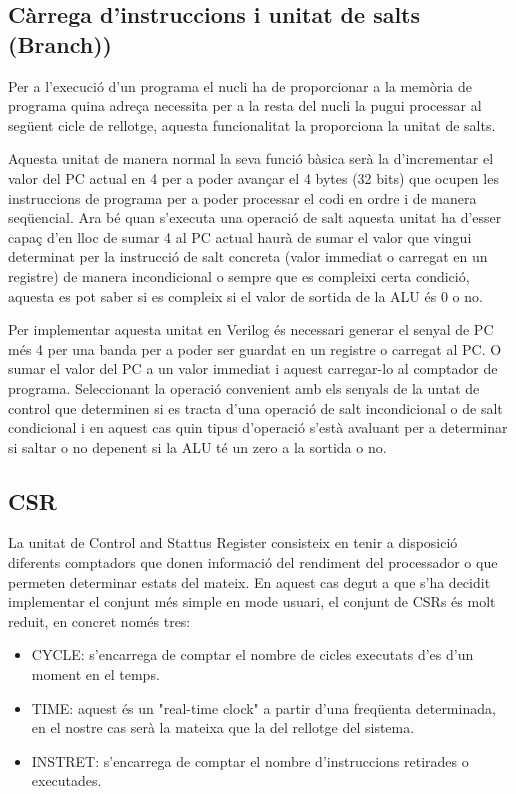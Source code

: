 \documentclass[10pt,a4paper,twocolumn,twoside]{article}
\begin{document}
    \subsection{ Càrrega d'instruccions i unitat de salts (Branch))}%
    Per a l'execució d'un programa el nucli ha de proporcionar a la memòria de programa quina adreça necessita per a la resta del nucli la pugui processar al següent cicle de rellotge, aquesta funcionalitat la proporciona la unitat de salts. 
    
    Aquesta unitat de manera normal la seva funció bàsica serà la d'incrementar el valor del PC actual en 4 per a poder avançar el 4 bytes (32 bits) que ocupen les instruccions de programa per a poder processar el codi en ordre i de manera seqüencial. Ara bé quan s'executa una operació de salt aquesta unitat ha d'esser capaç d'en lloc de sumar 4 al PC actual haurà de sumar el valor que vingui determinat per la instrucció de salt concreta (valor immediat o carregat en un registre) de manera incondicional o sempre que es compleixi certa condició, aquesta es pot saber si es compleix si el valor de sortida de la ALU és 0 o no.
    
    Per implementar aquesta unitat en Verilog és necessari generar el senyal de PC més 4 per una banda per a poder ser guardat en un registre o carregat al PC. O sumar el valor del PC a un valor immediat i aquest carregar-lo al comptador de programa. Seleccionant la operació convenient amb els senyals de la untat de control que determinen si es tracta d'una operació de salt incondicional o de salt condicional i en aquest cas quin  tipus d'operació s'està avaluant per a determinar si saltar o no depenent si la ALU té un zero a la sortida o no.
    
    
    \subsection{CSR}
    La unitat de Control and Stattus Register consisteix en tenir a disposició diferents comptadors que donen informació del rendiment del processador o que permeten determinar estats del mateix. 
    En aquest cas degut a que s'ha decidit implementar el conjunt més simple en mode usuari, el conjunt de CSRs és molt reduit, en concret només tres: 
    \begin{itemize}
        \item CYCLE: s'encarrega de comptar el nombre de cicles executats d'es d'un moment en el temps.
        \item TIME: aquest és un "real-time clock" a partir d'una freqüenta determinada, en el nostre cas serà la mateixa que la del rellotge del sistema.
        \item INSTRET: s'encarrega de comptar el nombre d'instruccions retirades o executades.
    \end{itemize}
    
\end{document}
